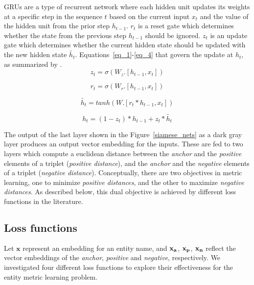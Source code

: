 GRUs are a type of recurrent network \cite{cho-al-emnlp14} where each hidden unit updates its weights at a specific step in the sequence $t$ based on the current input $x_t$ and the value of the hidden unit from the prior step $h_{t-1}$.  $r_t$ is a reset gate which determines whether the state from the previous step $h_{t-1}$ should be ignored. $z_t$ is an update gate which determines whether the current hidden state should be updated with the new hidden state $\tilde{h_t}$.  Equations~\ref{eq_1}-\ref{eq_4} that govern the update at $h_t$, as summarized by \cite{colah}.
\begin{equation}
z_t = \sigma(W_z . [h_{t-1}, x_t])
\label{eq_1}
\end{equation}

\begin{equation}
r_t = \sigma(W_r . [h_{t-1}, x_t])
\label{eq_2}
\end{equation}

\begin{equation}
\tilde{h_t} = tanh (W . [r_t * h_{t-1}, x_t])
\label{eq_3}
\end{equation}

\begin{equation}
h_t = (1- z_t) * h_{t-1} + z_t * \tilde{h_t}
\label{eq_4}
\end{equation}

The output of the last layer shown in the Figure~\ref{siamese_nets} as a dark gray layer produces an output vector embedding for the inputs.  These are fed to two layers which compute a euclidean distance between the \textit{anchor} and the \textit{positive} elements of a triplet (\textit{positive distance}), and the \textit{anchor} and the \textit{negative} elements of a triplet (\textit{negative distance}).  Conceptually, there are two objectives in metric learning, one to minimize \textit{positive distances}, and the other to maximize \textit{negative distances}.  As described below, this dual objective is achieved by different loss functions in the literature.

\subsection{Loss functions}
\label{loss_functions}

Let $\mathbf{x}$ represent an embedding for an entity name, and $\bf{x_{a}}$, $\bf{x_{p}}$, $\bf{x_{n}}$ reflect the vector embeddings of the \textit{anchor}, \textit{positive} and \textit{negative}, respectively.  We investigated four different loss functions to explore their effectiveness for the entity metric learning problem.

